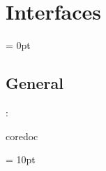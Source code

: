
\section{Interfaces} 


\parskip = 0pt

\vspace{3mm} \subsection*{General}

: 

coredoc
\vspace{2mm}

\vspace{5mm}\parskip = 10pt 
